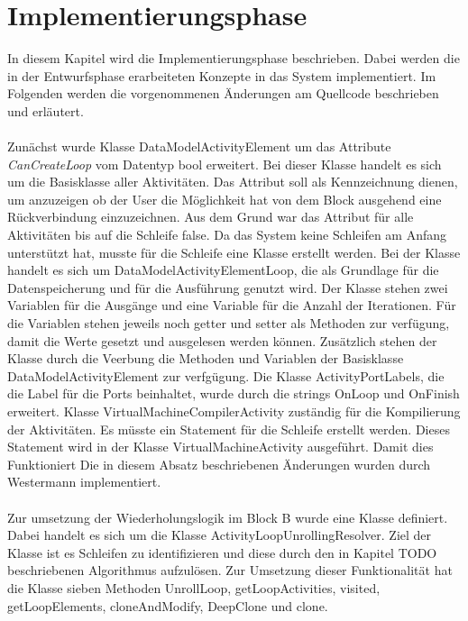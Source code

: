 \documentclass{article}
\begin{document}
    \section{Implementierungsphase}
    In diesem Kapitel wird die Implementierungsphase beschrieben. 
    Dabei werden die in der Entwurfsphase erarbeiteten Konzepte in das System implementiert. \cite{24}
    Im Folgenden werden die vorgenommenen Änderungen am Quellcode beschrieben und erläutert.\\
    \\
    Zunächst wurde Klasse DataModelActivityElement um das Attribute \textit{CanCreateLoop} vom Datentyp bool erweitert. Bei dieser Klasse handelt es sich um die Basisklasse aller Aktivitäten.
    Das Attribut soll als Kennzeichnung dienen, um anzuzeigen ob der User die Möglichkeit hat von dem Block ausgehend eine Rückverbindung einzuzeichnen. Aus dem Grund war das Attribut für alle Aktivitäten bis auf die Schleife false.
    Da das System keine Schleifen am Anfang unterstützt hat, musste für die Schleife eine Klasse erstellt werden.
    Bei der Klasse handelt es sich um DataModelActivityElementLoop, die als Grundlage für die Datenspeicherung und für die Ausführung genutzt wird.
    Der Klasse stehen zwei Variablen für die Ausgänge und eine Variable für die Anzahl der Iterationen. 
    Für die Variablen stehen jeweils noch getter und setter als Methoden zur verfügung, damit die Werte gesetzt und ausgelesen werden können.
    Zusätzlich stehen der Klasse durch die Veerbung die Methoden und Variablen der Basisklasse DataModelActivityElement zur verfgügung.
    Die Klasse ActivityPortLabels, die die Label für die Ports beinhaltet, wurde durch die strings OnLoop und OnFinish erweitert.
    Klasse VirtualMachineCompilerActivity zuständig für die Kompilierung der Aktivitäten. Es müsste ein Statement für die Schleife erstellt werden.
    Dieses Statement wird in der Klasse VirtualMachineActivity ausgeführt.
    Damit dies Funktioniert
    Die in diesem Absatz beschriebenen Änderungen wurden durch Westermann implementiert.\\
    \\
    Zur umsetzung der Wiederholungslogik im Block B wurde eine Klasse definiert.
    Dabei handelt es sich um die Klasse ActivityLoopUnrollingResolver.
    Ziel der Klasse ist es Schleifen zu identifizieren und diese durch den in Kapitel TODO beschriebenen Algorithmus aufzulösen.
    Zur Umsetzung dieser Funktionalität hat die Klasse sieben Methoden UnrollLoop, getLoopActivities, visited, getLoopElements, cloneAndModify, DeepClone und clone.\\
\end{document}
